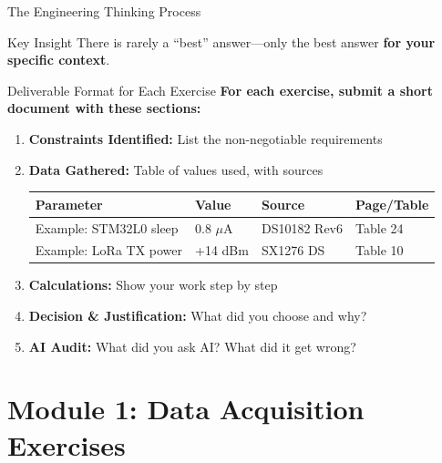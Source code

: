 \documentclass[aspectratio=169,11pt]{beamer}
\begin{document}
\begin{frame}{The Engineering Thinking Process}
    \vspace{0.4cm}
    \begin{exampleblock}{Key Insight}
        There is rarely a ``best'' answer---only the best answer \textbf{for your specific context}.
    \end{exampleblock}
\end{frame}

\begin{frame}{Deliverable Format for Each Exercise}
    \textbf{For each exercise, submit a short document with these sections:}
    
    \vspace{0.3cm}
    \begin{enumerate}
        \item \textbf{Constraints Identified:} List the non-negotiable requirements
        
        \item \textbf{Data Gathered:} Table of values used, with sources
        \begin{center}
        \footnotesize
        \begin{tabular}{llll}
            \toprule
            \textbf{Parameter} & \textbf{Value} & \textbf{Source} & \textbf{Page/Table} \\
            \midrule
            Example: STM32L0 sleep & 0.8 $\mu$A & DS10182 Rev6 & Table 24 \\
            Example: LoRa TX power & +14 dBm & SX1276 DS & Table 10 \\
            \bottomrule
        \end{tabular}
        \normalsize
        \end{center}
        
        \item \textbf{Calculations:} Show your work step by step
        
        \item \textbf{Decision \& Justification:} What did you choose and why?
        
        \item \textbf{AI Audit:} What did you ask AI? What did it get wrong?
    \end{enumerate}
\end{frame}

\section{Module 1: Data Acquisition Exercises}
\end{document}
